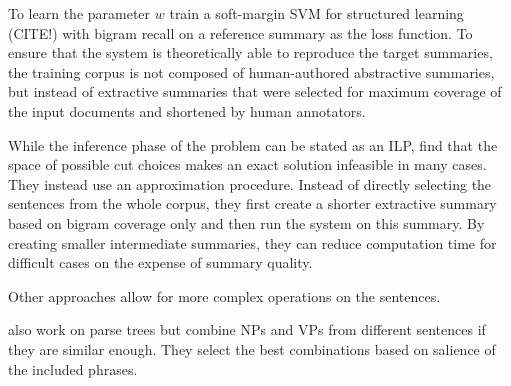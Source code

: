 \documentclass[a4paper,BCOR=10mm]{report}
\begin{document}
To learn the parameter $w$ \citeauthor{berg-kirkpatrick} train a soft-margin SVM for structured learning (CITE!) with bigram recall on a reference summary as the loss function. To ensure that the system is theoretically able to reproduce the target summaries, the training corpus is not composed of human-authored abstractive summaries, but instead of extractive summaries that were selected for maximum coverage of the input documents and shortened by human annotators.

While the inference phase of the problem can be stated as an ILP, \citet{berg-kirkpatrick} find that the space of possible cut choices makes an exact solution infeasible in many cases. They instead use an approximation procedure. Instead of directly selecting the sentences from the whole corpus, they first create a shorter extractive summary based on bigram coverage only and then run the system on this summary. By creating smaller intermediate summaries, they can reduce computation time for difficult cases on the expense of summary quality.





Other approaches allow for more complex operations on the sentences.



\citet{bing} also work on parse trees but combine NPs and VPs from different sentences if they are similar enough. They select the best combinations based on salience of the included phrases.
\end{document}
